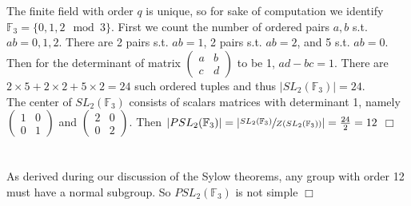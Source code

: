 \documentclass{article}
\begin{document}
\section{}
The finite field with order $q$ is unique, so for sake of computation we identify $\mathbb{F}_3 = \{0,1,2 \mod 3\}$. First we count the number of ordered pairs $a,b$ s.t. $ab = 0,1,2$. There are 2 pairs s.t. $ab = 1$, 2 pairs s.t. $ab = 2$, and 5 s.t. $ab = 0$. Then for the determinant of matrix $\left(\begin{matrix}
a & b\\ c & d
\end{matrix}\right)$ to be 1, $ad-bc = 1$. There are $2 \times 5 + 2 \times 2 + 5 \times 2 = 24$ such ordered tuples and thus $|SL_2(\mathbb{F}_3)| = 24$.\\
The center of $SL_2(\mathbb{F}_3)$ consists of scalars matrices with determinant 1, namely $\left(\begin{matrix}
1 & 0\\ 0 & 1
\end{matrix}\right)$ and $\left(\begin{matrix}
2 & 0\\ 0 & 2
\end{matrix}\right)$. Then $|PSL_2(\mathbb{F}_3)| = \lvert\sfrac{SL_2(\mathbb{F}_3)}{Z(SL_2(\mathbb{F}_3))}\rvert = \frac{24}{2} = 12$ $\Box$

\section{}
As derived during our discussion of the Sylow theorems, any group with order 12 must have a normal subgroup. So $PSL_2(\mathbb{F}_3)$ is not simple $\Box$
\end{document}
